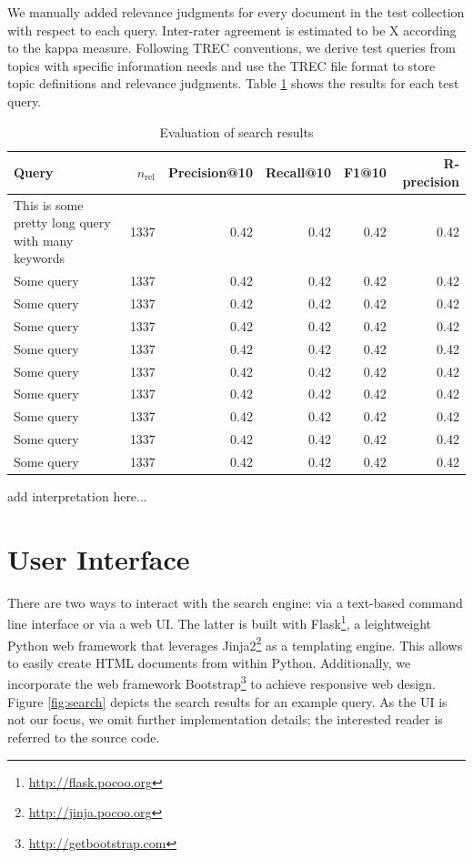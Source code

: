 \documentclass{sig-alternate-05-2015}
\begin{document}
We manually added relevance judgments for every document in the test collection with respect to each query. Inter-rater agreement is estimated to be X according to the kappa measure. Following TREC conventions, we derive test queries from topics with specific information needs and use the TREC file format to store topic definitions and relevance judgments. Table \ref{tbl:evalsearch} shows the results for each test query.

\begin{table}[th]
\centering
\caption{Evaluation of search results} \label{tbl:evalsearch}
\begin{tabular}{lrrrrr}
Query & $n_\text{rel}$ & Precision@10 & Recall@10 & F1@10 & R-precision \\
\hline
This is some pretty long query with many keywords & 1337 & 0.42 & 0.42 & 0.42 & 0.42 \\
Some query & 1337 & 0.42 & 0.42 & 0.42 & 0.42 \\
Some query & 1337 & 0.42 & 0.42 & 0.42 & 0.42 \\
Some query & 1337 & 0.42 & 0.42 & 0.42 & 0.42 \\
Some query & 1337 & 0.42 & 0.42 & 0.42 & 0.42 \\
Some query & 1337 & 0.42 & 0.42 & 0.42 & 0.42 \\
Some query & 1337 & 0.42 & 0.42 & 0.42 & 0.42 \\
Some query & 1337 & 0.42 & 0.42 & 0.42 & 0.42 \\
Some query & 1337 & 0.42 & 0.42 & 0.42 & 0.42 \\
Some query & 1337 & 0.42 & 0.42 & 0.42 & 0.42 \\
\end{tabular}
\end{table}

add interpretation here...   

\section{User Interface}

There are two ways to interact with the search engine: via a text-based command line interface or via a web UI. The latter is built with Flask\footnote{\url{http://flask.pocoo.org}}, a leightweight Python web framework that leverages Jinja2\footnote{\url{http://jinja.pocoo.org}} as a templating engine. This allows to easily create HTML documents from within Python. Additionally, we incorporate the web framework Bootstrap\footnote{\url{http://getbootstrap.com}} to achieve responsive web design. Figure \ref{fig:search} depicts the search results for an example query. As the UI is not our focus, we omit further implementation details; the interested reader is referred to the source code.
\end{document}
